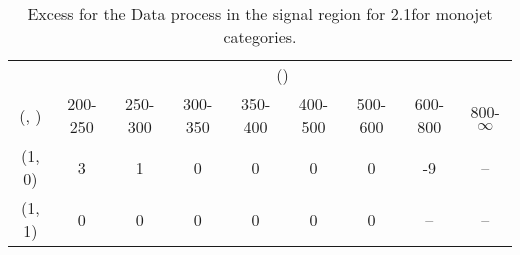 \begin{table}[h!]
\tiny
\centering
\caption{Excess for the Data process in the signal region for 2.1\ifb for monojet categories.\label{tab:excesssep_sig_data_mono}}
\begin{tabular}
{ccccccccc}
	\hline\hline
	& \multicolumn{8}{c}{\scalht (\gev)} \\ 
	 (\njet,  \nb) & 200-250 & 250-300 & 300-350 & 350-400 & 400-500 & 500-600 & 600-800 & 800-$\infty$ \\ [0.8ex] 
\hline
	(1, 0) & 3 & 1 & 0 & 0 & 0 & 0 & -9 & -- \\[0.5ex] 
	(1, 1) & 0 & 0 & 0 & 0 & 0 & 0 & -- & -- \\[0.5ex] 
	\hline
	\hline
\end{tabular}
\end{table}
